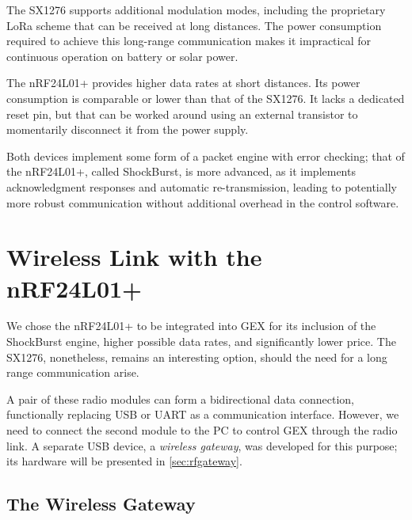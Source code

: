 The SX1276 supports additional modulation modes, including the proprietary LoRa scheme that can be received at long distances. The power consumption required to achieve this long-range communication makes it impractical for continuous operation on battery or solar power.

The nRF24L01+ provides higher data rates at short distances. Its power consumption is comparable or lower than that of the SX1276. It lacks a dedicated reset pin, but that can be worked around using an external transistor to momentarily disconnect it from the power supply.

Both devices implement some form of a packet engine with error checking; that of the nRF24L01+, called ShockBurst, is more advanced, as it implements acknowledgment responses and automatic re-transmission, leading to potentially more robust communication without additional overhead in the control software.


\section{Wireless Link with the nRF24L01+}

We chose the nRF24L01+ to be integrated into GEX for its inclusion of the ShockBurst engine, higher possible data rates, and significantly lower price. The SX1276, nonetheless, remains an interesting option, should the need for a long range communication arise.

A pair of these radio modules can form a bidirectional data connection, functionally replacing \gls{USB} or \gls{UART} as a communication interface. However, we need to connect the second module to the \gls{PC} to control GEX through the radio link. A separate \gls{USB} device, a \textit{wireless gateway}, was developed for this purpose; its hardware will be presented in \cref{sec:rfgateway}.

\subsection{The Wireless Gateway}

